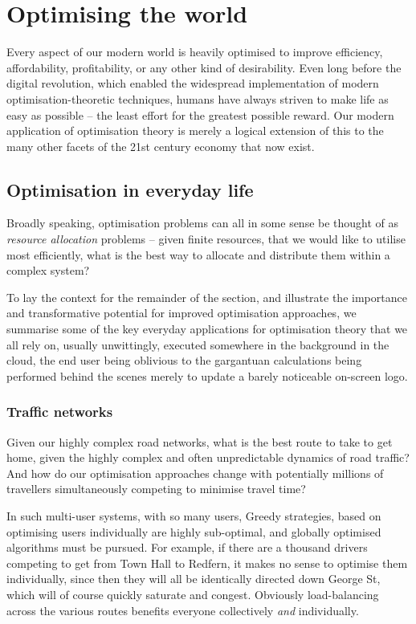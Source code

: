 %
%

\section{Optimising the world}

Every aspect of our modern world is heavily optimised to improve efficiency, affordability, profitability, or any other kind of desirability. Even long before the digital revolution, which enabled the widespread implementation of modern optimisation-theoretic techniques, humans have always striven to make life as easy as possible -- the least effort for the greatest possible reward. Our modern application of optimisation theory is merely a logical extension of this to the many other facets of the 21st century economy that now exist.

\subsection{Optimisation in everyday life}

Broadly speaking, optimisation problems can all in some sense be thought of as \textit{resource allocation} problems -- given finite resources, that we would like to utilise most efficiently, what is the best way to allocate and distribute them within a complex system?

To lay the context for the remainder of the section, and illustrate the importance and transformative potential for improved optimisation approaches, we summarise some of the key everyday applications for optimisation theory that we all rely on, usually unwittingly, executed somewhere in the background in the cloud, the end user being oblivious to the gargantuan calculations being performed behind the scenes merely to update a barely noticeable on-screen logo.

\subsubsection{Traffic networks}

Given our highly complex road networks, what is the best route to take to get home, given the highly complex and often unpredictable dynamics of road traffic? And how do our optimisation approaches change with potentially millions of travellers simultaneously competing to minimise travel time?

In such multi-user systems, with so many users, {\sc Greedy} strategies, based on optimising users individually are highly sub-optimal, and globally optimised algorithms must be pursued. For example, if there are a thousand drivers competing to get from Town Hall to Redfern, it makes no sense to optimise them individually, since then they will all be identically directed down George St, which will of course quickly saturate and congest. Obviously load-balancing across the various routes benefits everyone collectively \textit{and} individually.

